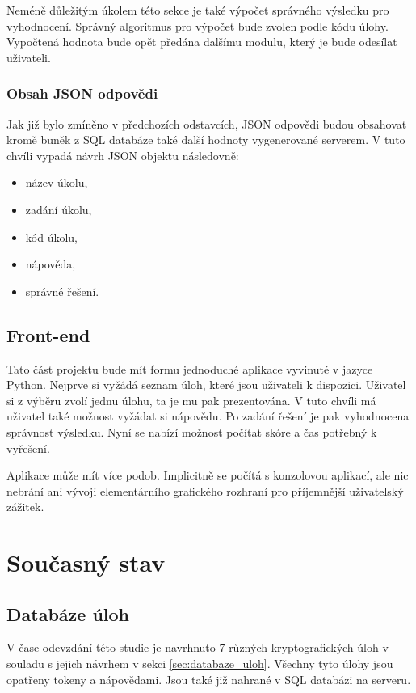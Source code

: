\documentclass[titlepage]{article}
\begin{document}
Neméně důležitým úkolem této sekce je také výpočet správného výsledku pro vyhodnocení. Správný algoritmus pro výpočet bude zvolen podle kódu úlohy. Vypočtená hodnota bude opět předána dalšímu modulu, který je bude odesílat uživateli. 

\subsubsection{Obsah JSON odpovědi}\label{sec:obsa_json}
Jak již bylo zmíněno v předchozích odstavcích, JSON odpovědi budou obsahovat kromě buněk z SQL databáze také další hodnoty vygenerované serverem. V tuto chvíli vypadá návrh JSON objektu následovně:
\begin{itemize}
    \item název úkolu,
    \item zadání úkolu,
    \item kód úkolu,
    \item nápověda,
    \item správné řešení.
\end{itemize}


\subsection{Front-end}
Tato část projektu bude mít formu jednoduché aplikace vyvinuté v jazyce Python. Nejprve si vyžádá seznam úloh, které jsou uživateli k dispozici. Uživatel si z výběru zvolí jednu úlohu, ta je mu pak prezentována. V tuto chvíli má uživatel také možnost vyžádat si nápovědu. Po zadání řešení je pak vyhodnocena správnost výsledku. Nyní se nabízí možnost počítat skóre a čas potřebný k vyřešení. 

Aplikace může mít více podob. Implicitně se počítá s konzolovou aplikací, ale nic nebrání ani vývoji elementárního grafického rozhraní pro příjemnější uživatelský zážitek. 



\section{Současný stav}
\subsection{Databáze úloh}
V čase odevzdání této studie je navrhnuto 7 různých kryptografických úloh v souladu s jejich návrhem v sekci \ref{sec:databaze_uloh}. Všechny tyto úlohy jsou opatřeny tokeny  a nápovědami. Jsou také již nahrané v SQL databázi na serveru. 
\end{document}
